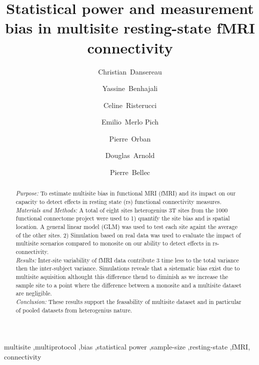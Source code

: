 \documentclass[authoryear]{elsarticle}
\begin{document}
\begin{frontmatter}

\title{Statistical power and measurement bias in multisite resting-state fMRI connectivity}



\author[a,b]{Christian~Dansereau}
\author[a]{Yassine~Benhajali}
\author[c]{Celine~Risterucci}
\author[c]{Emilio~Merlo Pich}
\author[a]{Pierre~Orban}
\author[d]{Douglas~Arnold}
\author[a,b]{Pierre~Bellec}
\address[a]{Centre de Recherche de l'Institut Universitaire de G\'eriatrie de Montr\'eal, Montr\'eal, CA}
\address[b]{D\'epartement d'Informatique et de recherche op\'erationnelle, Universit\'e de Montr\'eal, Montr\'eal,CA}
\address[c]{F. Hoffmann-La Roche Ldt., Basel, Switzerland}
\address[d]{NeuroRx, Montreal, Quebec, Canada}

\begin{abstract}
\textit{Purpose:} To estimate multisite bias in functional MRI (fMRI) and its impact on our capacity to detect effects in resting state (rs) functional connectivity measures.\\
\textit{Materials and Methods:} A total of eight sites heterogenius 3T sites from the 1000 functional connectome project were used to 1) quantify the site bias and is spatial location. A general linear model (GLM) was used to test each site againt the average of the other sites. 2) Simulation based on real data was used to evaluate the impact of multisite scenarios compared to monosite on our ability to detect effects in rs-connectivity.\\
\textit{Results:} Inter-site variability of fMRI data contribute 3 time less to the total variance then the inter-subject variance. Simulations reveale that a sistematic bias exist due to multisite aquisition althought this difference thend to diminish as we increase the sample site to a point where the difference between a monosite and a multisite dataset are negligible.\\
\textit{Conclusion:} These results support the feasability of multisite dataset and in particular of pooled datasets from heterogenius nature.
\end{abstract}

\begin{keyword}
multisite \sep multiprotocol \sep bias \sep statistical power \sep sample-size \sep resting-state \sep fMRI, connectivity
\end{keyword}
\end{frontmatter}
\end{document}
